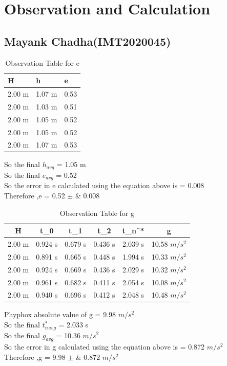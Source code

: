 \documentclass[11pt]{scrartcl} %
\begin{document}
\section{Observation and Calculation}
\subsection{Mayank Chadha(IMT2020045)}

\begin{table}[h] %
	\centering %
	\begin{tabular}{l l l}
		\toprule
		\textbf{H} & \textbf{h} & \textbf{e} \\
		\midrule
		2.00 m & 1.07 m & 0.53\\
        2.00 m & 1.03 m & 0.51\\
        2.00 m & 1.05 m & 0.52\\
        2.00 m & 1.05 m & 0.52\\
        2.00 m & 1.07 m & 0.53\\
		\bottomrule
	\end{tabular}
	\caption{Observation Table for e}
\end{table}
So the final $h_{avg}$ = 1.05 m\\
So the final $e_{avg}$ = 0.52\\
So the error in e calculated using the equation above is  = 0.008 \\
Therefore ,e = 0.52  $\pm$ &  0.008 \\

\begin{table}[h]
\centering
\begin{tabular}{||c c c c c c||} 
\toprule
 \hline
 H & t_0 & t_1 & t_2 & t_n^* & g \\ [0.5ex] 
 \midrule
 \hline\hline
 2.00 m & 0.924 s & 0.679 s  & 0.436 s & 2.039 s & 10.58 $m/s^2$  \\ 
 \hline
 2.00 m & 0.891 s & 0.665 s & 0.448 s & 1.994 s & 10.33 $m/s^2$  \\
 \hline
 2.00 m & 0.924 s & 0.669 s & 0.436 s & 2.029 s  & 10.32 $m/s^2$   \\
 \hline
 2.00 m & 0.961 s & 0.682 s & 0.411 s & 2.054 s  & 10.08 $m/s^2$   \\
 \hline
 2.00 m & 0.940 s & 0.696 s & 0.412 s & 2.048 s  & 10.48 $m/s^2$  \\ [1ex]
 \bottomrule
 \hline
\end{tabular}
\caption{Observation Table for g}
\end{table}
Phyphox absolute value of g = 9.98 $m/s^2$ \\
So the final $t_n^*_{avg}$ = 2.033 s\\
So the final $g_{avg}$ = 10.36 $m/s^2$\\
So the error in g calculated using the equation above is  = 0.872  $m/s^2$\\
Therefore ,g = 9.98  $\pm$ &  0.872 $m/s^2$ \\
\newpage
\end{document}
